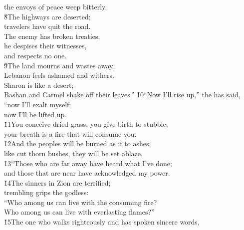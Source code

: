 \begin{poetry}
\poemll    the envoys of peace weep bitterly. \\
\poeml \v{8}The highways are deserted; \\
\poemll    travelers have quit the road. \\
\poeml The enemy has broken treaties; \\
\poemll    he despises their witnesses, \\
\poemlll       and respects no one. \\
\poeml \v{9}The land mourns and wastes away; \\
\poemll    Lebanon feels ashamed and withers. \\
\poeml Sharon is like a desert; \\
\poemll    Bashan and Carmel shake off their leaves.''
\poeml \v{10}``Now I'll rise up,'' the  has said, \\
\poemll    ``now I'll exalt myself; \\
\poemlll       now I'll be lifted up. \\
\poeml \v{11}You conceive dried grass, you give birth to stubble; \\
\poemll    your breath is a fire that will consume you. \\
\poeml \v{12}And the peoples will be burned as if to ashes; \\
\poemll    like cut thorn bushes, they will be set ablaze. \\
\poeml \v{13}``Those who are far away have heard what I've done; \\
\poemll    and those that are near have acknowledged my power. \\
\poeml \v{14}The sinners in Zion are terrified; \\
\poemll    trembling grips the godless: \\
\poeml ``Who among us can live with the consuming fire? \\
\poemll    Who among us can live with everlasting flames?'' \\
\poeml \v{15}The one who walks righteously and has spoken sincere words, \\

\end{poetry}
